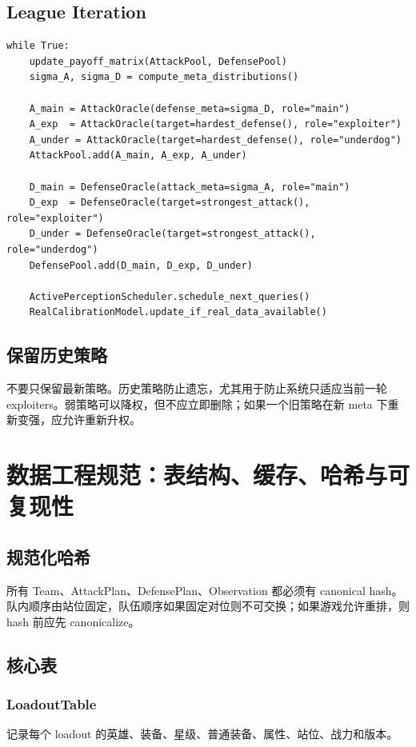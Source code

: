 \documentclass[UTF8,12pt,openany]{ctexbook}
\begin{document}
\section{League Iteration}
\begin{lstlisting}[caption={League 训练循环}]
while True:
    update_payoff_matrix(AttackPool, DefensePool)
    sigma_A, sigma_D = compute_meta_distributions()

    A_main = AttackOracle(defense_meta=sigma_D, role="main")
    A_exp  = AttackOracle(target=hardest_defense(), role="exploiter")
    A_under = AttackOracle(target=hardest_defense(), role="underdog")
    AttackPool.add(A_main, A_exp, A_under)

    D_main = DefenseOracle(attack_meta=sigma_A, role="main")
    D_exp  = DefenseOracle(target=strongest_attack(), role="exploiter")
    D_under = DefenseOracle(target=strongest_attack(), role="underdog")
    DefensePool.add(D_main, D_exp, D_under)

    ActivePerceptionScheduler.schedule_next_queries()
    RealCalibrationModel.update_if_real_data_available()
\end{lstlisting}

\section{保留历史策略}
不要只保留最新策略。历史策略防止遗忘，尤其用于防止系统只适应当前一轮 exploiters。弱策略可以降权，但不应立即删除；如果一个旧策略在新 meta 下重新变强，应允许重新升权。


\chapter{数据工程规范：表结构、缓存、哈希与可复现性}

\section{规范化哈希}
所有 Team、AttackPlan、DefensePlan、Observation 都必须有 canonical hash。队内顺序由站位固定，队伍顺序如果固定对位则不可交换；如果游戏允许重排，则 hash 前应先 canonicalize。

\section{核心表}
\subsection{LoadoutTable}
记录每个 loadout 的英雄、装备、星级、普通装备、属性、站位、战力和版本。
\end{document}
